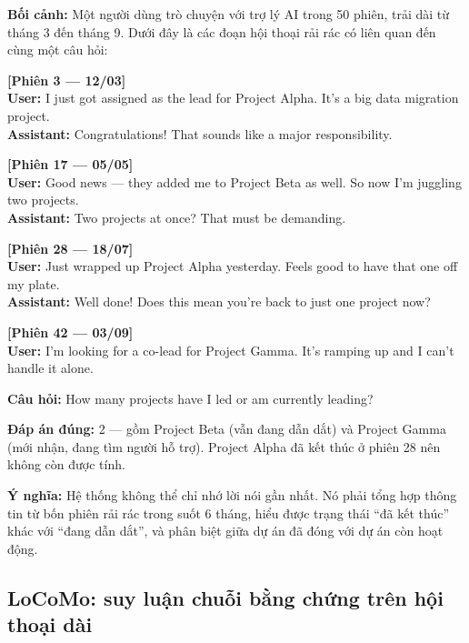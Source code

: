 \documentclass[../main.tex]{subfiles}
\begin{document}
\begin{tcolorbox}[colback=black!1,colframe=black!30,breakable,title={Ví dụ mẫu từ LongMemEval}]
\textbf{Bối cảnh:} Một người dùng trò chuyện với trợ lý AI trong 50 phiên, trải dài từ tháng 3 đến tháng 9. Dưới đây là các đoạn hội thoại rải rác có liên quan đến cùng một câu hỏi:

\bigskip
\noindent\textbf{[Phiên 3 — 12/03]} \\
\textbf{User:} I just got assigned as the lead for Project Alpha. It's a big data migration project. \\
\textbf{Assistant:} Congratulations! That sounds like a major responsibility.

\bigskip
\noindent\textbf{[Phiên 17 — 05/05]} \\
\textbf{User:} Good news — they added me to Project Beta as well. So now I'm juggling two projects. \\
\textbf{Assistant:} Two projects at once? That must be demanding.

\bigskip
\noindent\textbf{[Phiên 28 — 18/07]} \\
\textbf{User:} Just wrapped up Project Alpha yesterday. Feels good to have that one off my plate. \\
\textbf{Assistant:} Well done! Does this mean you're back to just one project now?

\bigskip
\noindent\textbf{[Phiên 42 — 03/09]} \\
\textbf{User:} I'm looking for a co-lead for Project Gamma. It's ramping up and I can't handle it alone.

\medskip
\noindent\textbf{Câu hỏi:} How many projects have I led or am currently leading?

\noindent\textbf{Đáp án đúng:} 2 — gồm Project Beta (vẫn đang dẫn dắt) và Project Gamma (mới nhận, đang tìm người hỗ trợ). Project Alpha đã kết thúc ở phiên 28 nên không còn được tính.

\noindent\textbf{Ý nghĩa:} Hệ thống không thể chỉ nhớ lời nói gần nhất. Nó phải tổng hợp thông tin từ bốn phiên rải rác trong suốt 6 tháng, hiểu được trạng thái ``đã kết thúc'' khác với ``đang dẫn dắt'', và phân biệt giữa dự án đã đóng với dự án còn hoạt động.
\end{tcolorbox}

\subsection{LoCoMo: suy luận chuỗi bằng chứng trên hội thoại dài}
\end{document}
